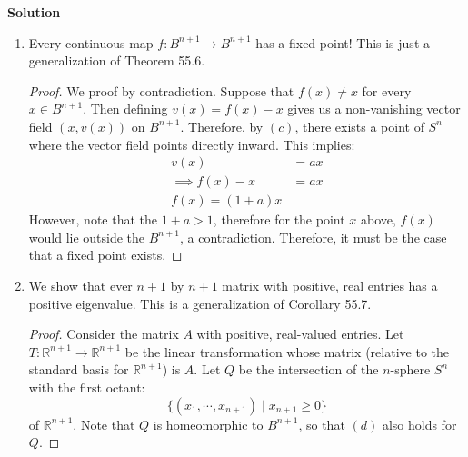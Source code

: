 \documentclass[12pt]{article}
\newcounter{AnswerCounter}
\newcounter{SubAnswerCounter}
\newenvironment{answer}[0]{
  \setcounter{SubAnswerCounter}{1}
  \bigskip
  \textbf{Solution \arabic{AnswerCounter}}
  \\
  \begin{small}
}{
  \end{small}
  \stepcounter{AnswerCounter}
}
\begin{document}
\begin{answer}[Page 353, \#4]
\begin{enumerate}
\begin{proof}
We suppose first that $v(x)$ does not point directly inward at any point $x \in S^n$ and work to derive a contradiction. Consider the map $v: B^{n+1} \to \mathbb{R}^{n+1} - \{0\}$, and let $w$ be the restriction of $v$ onto $S^n$. By the above lemma, because the map $w$ extends to $v$, it is nulhomotopic. \\

However, on the other hand, $w$ is homotopic to the inclusion map $j: S^n \to \mathbb{R}^2 - \{0\}$. The homotopy is given by:
$$
F(x,t) = tx + (1-t)w(x)
$$
for $x \in S^n$. We need to verify that $F: S^n \times [0,1] \to \mathbb{R}^{n+1} - \{0\}$. Note that $F(x,0) = w(x)$ and $F(x,1) = x$, which are both non-zero. Suppose that $F(x,t) = 0$ for some $t \in (0,1)$. Note that this implies that $\frac{t'}{t' - 1}x =w(x)$, contradicting our assumption about $v(x)$ (and hense $w(x)$ not pointing directly inward! Therefore, it folows that the range of $F$ is $\mathbb{R}^{n+1} - \{0\}$.\\

However, this implies that there exist a homotopy between the inclusion map and the constant map, therefore $j$ is nulhomotopic. This contradics what we showed in (b). Therefore, our assumption must be incorrect. \\
To show that $v$ points directly outward at some point of $S^n$, we apply the result just proved to the vector field $(x, -v(x))$. 
\end{proof}
\item Every continuous map $f: B^{n+1} \to B^{n+1}$ has a fixed point! This is just a generalization of Theorem 55.6.
\begin{proof}
We proof by contradiction. Suppose that $f(x) \neq x$ for every $x \in B^{n+1}$. Then defining $v(x) = f(x) - x$ gives us a non-vanishing vector field $(x,v(x))$ on $B^{n+1}$. Therefore, by $(c)$, there exists a point of $S^n$ where the vector field points directly inward. This implies:
\begin{align*}
v(x) &= ax \tag{$x > 0$} \\
\implies f(x) - x &= ax \\
f(x) = (1+a)x
\end{align*}
However, note that the $1 + a > 1$, therefore for the point $x$ above, $f(x)$ would lie outside the $B^{n+1}$, a contradiction. Therefore, it must be the case that a fixed point exists.
\end{proof}
\item We show that ever $n+1$ by $n+1$ matrix with positive, real entries has a positive eigenvalue. This is a generalization of Corollary 55.7. 
\begin{proof}
Consider the matrix $A$ with positive, real-valued entries. Let $T: \mathbb{R}^{n+1} \to \mathbb{R}^{n+1}$ be the linear transformation whose matrix (relative to the standard basis for $\mathbb{R}^{n+1}$) is $A$. Let $Q$ be the intersection of the $n$-sphere $S^n$ with the first octant:
$$
\{(x_1,\cdots,x_{n+1}) \mid x_{n+1} \geq 0\}
$$
of $\mathbb{R}^{n+1}$. Note that $Q$ is homeomorphic to $B^{n+1}$, so that $(d)$ also holds for $Q$.


\end{proof}
\end{enumerate}
\end{answer}
\end{document}

